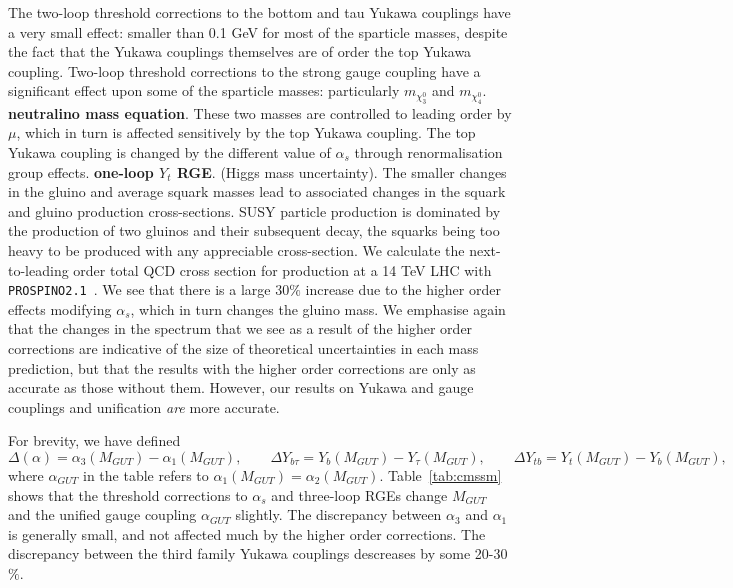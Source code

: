 \documentclass[final,3p,times,pdflatex]{elsarticle}
\begin{document}
The two-loop threshold corrections to the bottom and tau Yukawa couplings 
have a very small effect: smaller than 0.1 GeV for most of the sparticle
masses, despite the fact that the Yukawa couplings themselves are of order the
top Yukawa coupling. 
Two-loop threshold corrections to the strong gauge coupling have a significant
effect upon some of the sparticle masses: particularly $m_{\chi_3^0}$ and
$m_{\chi_4^0}$. {\bf neutralino mass equation}.
These two masses are controlled to leading order by $\mu$,
which in turn is affected sensitively by the top Yukawa coupling. 
The top Yukawa coupling is changed by the different value of $\alpha_s$
through renormalisation group effects. {\bf one-loop $Y_t$ RGE}.
(Higgs mass uncertainty).
The smaller changes in the gluino and average squark masses lead to associated
changes in the squark and gluino production cross-sections. 
SUSY particle production is dominated by the production of two gluinos and
their subsequent decay, the squarks being too heavy to be produced with any
appreciable cross-section. We calculate the next-to-leading order total QCD
cross section for production at a 14 TeV LHC with {\tt
  PROSPINO2.1}~\cite{Beenakker:1996ed,Beenakker:1996ch}. We see that there is
a large 30$\%$ increase due to the higher order effects modifying $\alpha_s$,
which in turn changes the gluino mass. We emphasise again that the changes in
the 
spectrum that we see as a result of the higher order corrections are
indicative of the size of theoretical uncertainties in 
each mass prediction, but that the results with the higher order corrections
are only as accurate as those without them. 
However, our results on Yukawa and gauge couplings and unification {\em are}
more accurate. 

For brevity, we have defined 
\begin{equation}
\Delta
(\alpha)=\alpha_3(M_{GUT})-\alpha_1(M_{GUT}),\qquad
\Delta Y_{b\tau}=Y_b(M_{GUT})-Y_\tau(M_{GUT}),\qquad
\Delta Y_{tb}=Y_t(M_{GUT})-Y_b(M_{GUT}),
\end{equation}
where $\alpha_{GUT}$ in the table refers to
$\alpha_1(M_{GUT})=\alpha_2(M_{GUT})$. 
Table~\ref{tab:cmssm} shows that the threshold corrections to $\alpha_s$ and
three-loop RGEs change $M_{GUT}$ and the unified gauge coupling $\alpha_{GUT}$
slightly. The discrepancy between $\alpha_{3}$ and $\alpha_1$ is generally
small, and not affected much by the higher order corrections. The discrepancy
between the third family Yukawa couplings descreases by some 20-30$\%$. 
\end{document}
